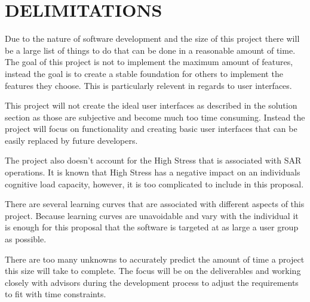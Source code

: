 \documentclass[12pt]{IEEEtran}
\begin{document}
% 	
\section{DELIMITATIONS}
Due to the nature of software development and the size of this project there
will be a large list of things to do that can be done in a reasonable amount of
time.  The goal of this project is not to implement the maximum amount of
features, instead the goal is to create a stable foundation for others to
implement the features they choose.  This is particularly relevent in regards to
user interfaces.  

This project will not create the ideal user interfaces as described in the
solution section as those are subjective and become much too time consuming. 
Instead the project will focus on functionality and creating basic user interfaces that can be
easily replaced by future developers.

The project also doesn't account for the High Stress that is associated with SAR
operations.  It is known that High Stress has a negative impact on an
individuals cognitive load capacity, however, it is too complicated to include in this proposal.  

There are several learning curves that are associated
with different aspects of this project.  Because learning curves are unavoidable
and vary with the individual it is enough for this proposal that the software is
targeted at as large a user group as possible.

There are too many unknowns to accurately predict the amount of time a project
this size will take to complete.  The focus will be on the deliverables and
working closely with advisors during the development process to adjust the
requirements to fit with time constraints.
\end{document}

